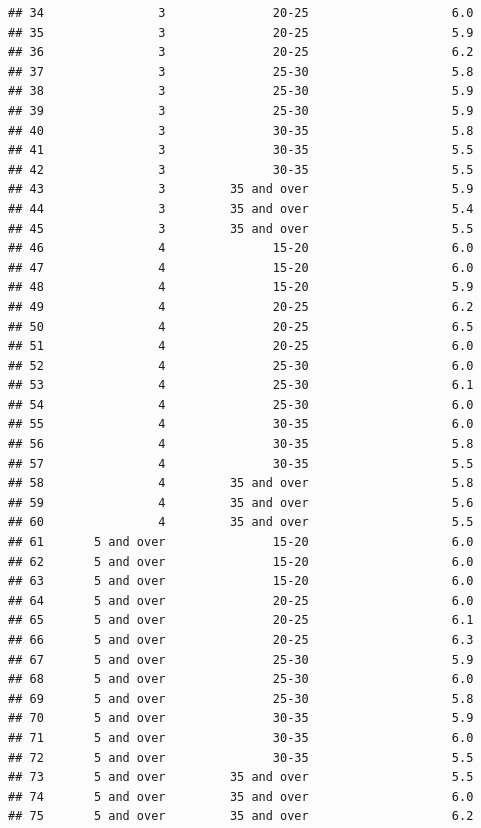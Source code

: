 \documentclass[11pt, a4paper]{article}\usepackage[]{graphicx}\usepackage[]{xcolor}
\makeatletter
\newenvironment{kframe}{%
 \def\at@end@of@kframe{}%
 \ifinner\ifhmode%
  \def\at@end@of@kframe{\end{minipage}}%
  \begin{minipage}{\columnwidth}%
 \fi\fi%
 \def\FrameCommand##1{\hskip\@totalleftmargin \hskip-\fboxsep
 \colorbox{shadecolor}{##1}\hskip-\fboxsep
     \hskip-\linewidth \hskip-\@totalleftmargin \hskip\columnwidth}%
 \MakeFramed {\advance\hsize-\width
   \@totalleftmargin\z@ \linewidth\hsize
   \@setminipage}}%
 {\par\unskip\endMakeFramed%
 \at@end@of@kframe}
\newenvironment{knitrout}{}{} %
\makeatother
\begin{document}
\begin{knitrout}
\begin{kframe}
\begin{verbatim}
## 34                3               20-25                    6.0
## 35                3               20-25                    5.9
## 36                3               20-25                    6.2
## 37                3               25-30                    5.8
## 38                3               25-30                    5.9
## 39                3               25-30                    5.9
## 40                3               30-35                    5.8
## 41                3               30-35                    5.5
## 42                3               30-35                    5.5
## 43                3         35 and over                    5.9
## 44                3         35 and over                    5.4
## 45                3         35 and over                    5.5
## 46                4               15-20                    6.0
## 47                4               15-20                    6.0
## 48                4               15-20                    5.9
## 49                4               20-25                    6.2
## 50                4               20-25                    6.5
## 51                4               20-25                    6.0
## 52                4               25-30                    6.0
## 53                4               25-30                    6.1
## 54                4               25-30                    6.0
## 55                4               30-35                    6.0
## 56                4               30-35                    5.8
## 57                4               30-35                    5.5
## 58                4         35 and over                    5.8
## 59                4         35 and over                    5.6
## 60                4         35 and over                    5.5
## 61       5 and over               15-20                    6.0
## 62       5 and over               15-20                    6.0
## 63       5 and over               15-20                    6.0
## 64       5 and over               20-25                    6.0
## 65       5 and over               20-25                    6.1
## 66       5 and over               20-25                    6.3
## 67       5 and over               25-30                    5.9
## 68       5 and over               25-30                    6.0
## 69       5 and over               25-30                    5.8
## 70       5 and over               30-35                    5.9
## 71       5 and over               30-35                    6.0
## 72       5 and over               30-35                    5.5
## 73       5 and over         35 and over                    5.5
## 74       5 and over         35 and over                    6.0
## 75       5 and over         35 and over                    6.2
\end{verbatim}
\end{kframe}
\end{knitrout}
\end{document}
